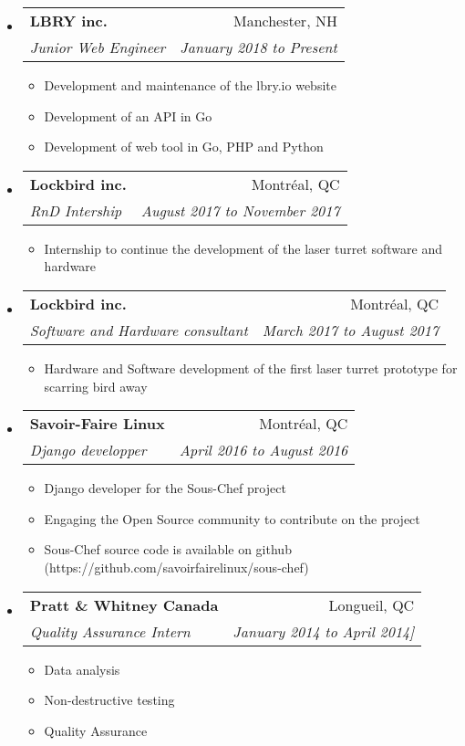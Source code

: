 \documentclass[letterpaper,11pt]{article}
\makeatletter
\newcommand{\ressubheading}[4]{
	\begin{tabular*}{6.5in}{l@{\cftdotfill{\cftsecdotsep}\extracolsep{\fill}}r}
		\textbf{#1} & #2 \\
		\textit{#3} & \textit{#4} \\
	\end{tabular*}\vspace{-6pt}}
\makeatother
\begin{document}
	\begin{itemize}
		
		\item
			\ressubheading{LBRY inc.}{Manchester, NH}{Junior Web Engineer}{January 2018 to Present}
			
			\begin{itemize}
				\item Development and maintenance of the lbry.io website
				\item Development of an API in Go
				\item Development of web tool in Go, PHP and Python
			\end{itemize}
		
		\item 
			\ressubheading{Lockbird inc.}{Montréal, QC}{RnD Intership}{August 2017 to November 2017}
			
			\begin{itemize}
				\item Internship to continue the development of the laser turret software and hardware
			\end{itemize}
			
		\item
			\ressubheading{Lockbird inc.}{Montréal, QC}{Software and Hardware consultant}{March 2017 to August 2017}
			
			\begin{itemize}
				\item Hardware and Software development of the first laser turret prototype for scarring bird away
			\end{itemize}
			
		\item
			\ressubheading{Savoir-Faire Linux}{Montréal, QC}{Django developper}{April 2016 to August 2016}
			
			\begin{itemize}
				\item Django developer for the Sous-Chef project
				\item Engaging the Open Source community to contribute on the project
				\item Sous-Chef source code is available on github (https://github.com/savoirfairelinux/sous-chef)
			\end{itemize}
			
		\item
			\ressubheading{Pratt \& Whitney Canada}{Longueil, QC}{Quality Assurance Intern}{January 2014 to April 2014]}
			
			\begin{itemize}
				\item Data analysis
				\item Non-destructive testing
				\item Quality Assurance
			\end{itemize}
	\end{itemize}
	
\end{document}
